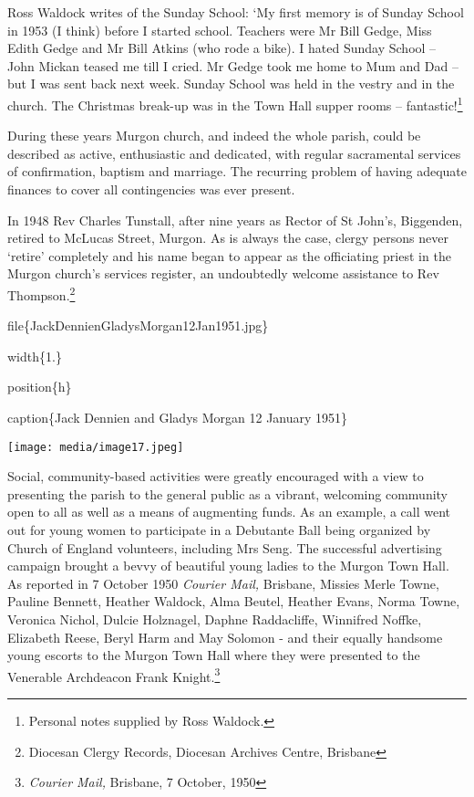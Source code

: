 Ross Waldock writes of the Sunday School: `My first memory is of Sunday
School in 1953 (I think) before I started school. Teachers were Mr Bill
Gedge, Miss Edith Gedge and Mr Bill Atkins (who rode a bike). I hated
Sunday School -- John Mickan teased me till I cried. Mr Gedge took me
home to Mum and Dad -- but I was sent back next week. Sunday School was
held in the vestry and in the church. The Christmas break-up was in the
Town Hall supper rooms -- fantastic!\footnote{Personal notes supplied by
  Ross Waldock.}

During these years Murgon church, and indeed the whole parish, could be
described as active, enthusiastic and dedicated, with regular
sacramental services of confirmation, baptism and marriage. The
recurring problem of having adequate finances to cover all contingencies
was ever present.

In 1948 Rev Charles Tunstall, after nine years as Rector of St John's,
Biggenden, retired to McLucas Street, Murgon. As is always the case,
clergy persons never `retire' completely and his name began to appear as
the officiating priest in the Murgon church's services register, an
undoubtedly welcome assistance to Rev Thompson.\footnote{Diocesan Clergy
  Records, Diocesan Archives Centre, Brisbane}

file\{JackDennienGladysMorgan12Jan1951.jpg\}

width\{1.\}

position\{h\}

caption\{Jack Dennien and Gladys Morgan 12 January 1951\}

\texttt{[image: media/image17.jpeg]}

Social, community-based activities were greatly encouraged with a view
to presenting the parish to the general public as a vibrant, welcoming
community open to all as well as a means of augmenting funds. As an
example, a call went out for young women to participate in a Debutante
Ball being organized by Church of England volunteers, including Mrs
Seng. The successful advertising campaign brought a bevvy of beautiful
young ladies to the Murgon Town Hall. As reported in 7 October 1950
\emph{Courier Mail,} Brisbane, Missies Merle Towne, Pauline Bennett,
Heather Waldock, Alma Beutel, Heather Evans, Norma Towne, Veronica
Nichol, Dulcie Holznagel, Daphne Raddacliffe, Winnifred Noffke,
Elizabeth Reese, Beryl Harm and May Solomon - and their equally handsome
young escorts to the Murgon Town Hall where they were presented to the
Venerable Archdeacon Frank Knight.\footnote{\emph{Courier Mail,}
  Brisbane, 7 October, 1950}

